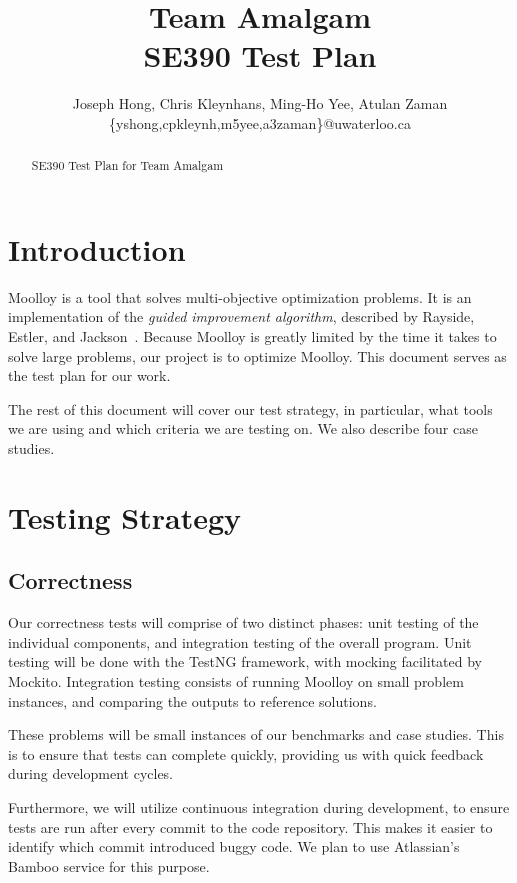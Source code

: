\documentclass[11pt]{article}
\title{{\Large Team Amalgam} \\ SE390 Test Plan}
\author{Joseph Hong, Chris Kleynhans, Ming-Ho Yee, Atulan Zaman \\
        \{yshong,cpkleynh,m5yee,a3zaman\}@uwaterloo.ca}
\begin{document}
\maketitle

\begin{abstract}
SE390 Test Plan for Team Amalgam
\end{abstract}

\tableofcontents
\newpage

\section{Introduction}

Moolloy is a tool that solves multi-objective optimization problems. It
is an implementation of the \textit{guided improvement algorithm},
described by Rayside, Estler, and Jackson~\cite{ref:Rayside09}. Because
Moolloy is greatly limited by the time it takes to solve large
problems, our project is to optimize Moolloy. This document serves as
the test plan for our work.

The rest of this document will cover our test strategy, in particular,
what tools we are using and which criteria we are testing on. We also
describe four case studies.

\section{Testing Strategy}

\subsection{Correctness}

Our correctness tests will comprise of two distinct phases: unit
testing of the individual components, and integration testing of the
overall program. Unit testing will be done with the TestNG framework,
with mocking facilitated by Mockito. Integration testing consists of
running Moolloy on small problem instances, and comparing the outputs
to reference solutions.

These problems will be small instances of our benchmarks and case
studies. This is to ensure that tests can complete quickly, providing
us with quick feedback during development cycles.

Furthermore, we will utilize continuous integration during development,
to ensure tests are run after every commit to the code repository. This
makes it easier to identify which commit introduced buggy code. We plan
to use Atlassian's Bamboo service for this purpose.
\end{document}
